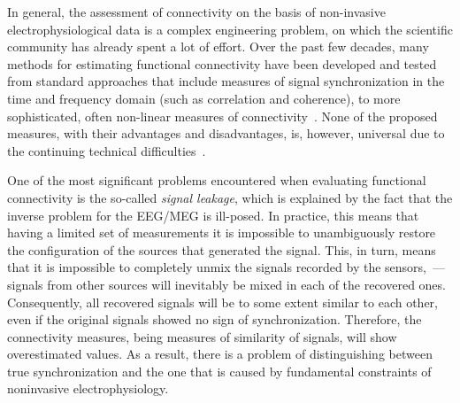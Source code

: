 
In general, the assessment of connectivity on the basis of non-invasive
electrophysiological data is a complex engineering problem, on which the
scientific community has already spent a lot of effort.  Over the past few
decades, many methods for estimating functional connectivity have been
developed and tested from standard approaches that include measures of signal
synchronization in the time and frequency domain (such as correlation and
coherence), to more sophisticated, often non-linear measures of
connectivity~\cite{Marzetti2008, Schoffelen2009, Colclough2015, kaminski,
greenblatt_conn, hillebrand, imcoh, Lachaux1999, env_corr, Brookes2012,
Hillebrand2012, PLI, wPLI, Chella2015, Chella2016, Wibral2011, Ioannides2000}.
None of the proposed measures, with their advantages and disadvantages, is,
however, universal due to the continuing technical
difficulties~\cite{Colclough2016, Bastos2016}.

One of the most significant problems encountered when evaluating functional
connectivity is the so-called \emph{signal leakage}, which is explained by the
fact that the inverse problem for the EEG/MEG is ill-posed. In practice, this
means that having a limited set of measurements it is impossible to
unambiguously restore the configuration of the sources that generated the
signal. This, in turn, means that it is impossible to completely unmix the
signals recorded by the sensors,~--- signals from other sources will
inevitably be mixed in each of the recovered ones. Consequently, all
recovered signals will be to some extent similar to each other, even if the
original signals showed no sign of synchronization. Therefore, the connectivity
measures, being measures of similarity of signals, will show overestimated
values. As a result, there is a problem of distinguishing between true
synchronization and the one that is caused by fundamental constraints of
noninvasive electrophysiology.

